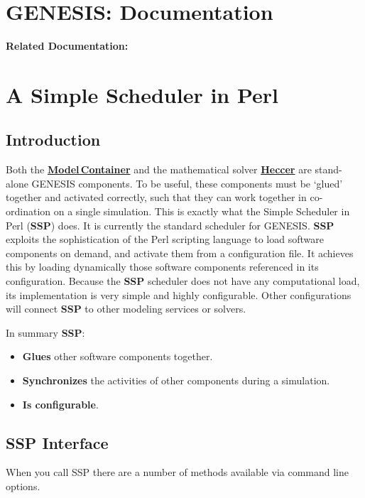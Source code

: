 \documentclass[12pt]{article}
\begin{document}
\section*{GENESIS: Documentation}

{\bf Related Documentation:}

\section*{A Simple Scheduler in Perl}

\subsection*{Introduction}

Both the \href{../model-container/model-container.tex}{\bf Model\,Container} and the mathematical solver \href{../heccer/heccer.tex}{\bf Heccer} are stand-alone GENESIS components. To be useful, these components must be `glued' together and activated correctly, such that they can work together in co-ordination on a single simulation. This is exactly what the Simple Scheduler in Perl ({\bf SSP}) does. It is currently the standard scheduler for GENESIS. {\bf SSP} exploits the sophistication of the Perl scripting language to load software components on demand, and activate them from a configuration file. It achieves this by loading dynamically those software components referenced in its configuration. Because the {\bf SSP} scheduler does not have any computational load, its implementation is very simple and highly configurable. Other configurations will connect {\bf SSP} to other modeling services or solvers.

In summary {\bf SSP}:

\begin{itemize}
\item {\bf Glues} other software components together.
\item {\bf Synchronizes} the activities of other components during a simulation.
\item {\bf Is configurable}. 
\end{itemize}

\subsection*{SSP Interface}

When you call SSP there are a number of methods available via command line options.
\end{document}
